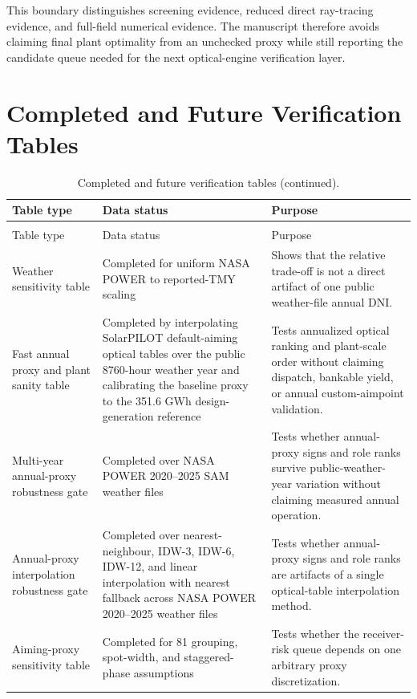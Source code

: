 \documentclass[final,3p,times]{elsarticle}
\begin{document}
This boundary distinguishes screening evidence, reduced direct ray-tracing evidence, and full-field numerical evidence. The manuscript therefore avoids claiming final plant optimality from an unchecked proxy while still reporting the candidate queue needed for the next optical-engine verification layer.

\section{Completed and Future Verification Tables}
\begin{longtable}{p{}p{}p{}}
\caption{Completed and future verification tables.} \label{tab:completed-future-verification}\\
\toprule
Table type & Data status & Purpose \\
\midrule
\endfirsthead
\caption[]{Completed and future verification tables (continued).}\\
\toprule
Table type & Data status & Purpose \\
\midrule
\endhead
Weather sensitivity table & Completed for uniform NASA POWER to reported-TMY scaling & Shows that the relative trade-off is not a direct artifact of one public weather-file annual DNI. \\
Fast annual proxy and plant sanity table & Completed by interpolating SolarPILOT default-aiming optical tables over the public 8760-hour weather year and calibrating the baseline proxy to the 351.6 GWh design-generation reference & Tests annualized optical ranking and plant-scale order without claiming dispatch, bankable yield, or annual custom-aimpoint validation. \\
Multi-year annual-proxy robustness gate & Completed over NASA POWER 2020--2025 SAM weather files & Tests whether annual-proxy signs and role ranks survive public-weather-year variation without claiming measured annual operation. \\
Annual-proxy interpolation robustness gate & Completed over nearest-neighbour, IDW-3, IDW-6, IDW-12, and linear interpolation with nearest fallback across NASA POWER 2020--2025 weather files & Tests whether annual-proxy signs and role ranks are artifacts of a single optical-table interpolation method. \\
Aiming-proxy sensitivity table & Completed for 81 grouping, spot-width, and staggered-phase assumptions & Tests whether the receiver-risk queue depends on one arbitrary proxy discretization. \\

\end{longtable}
\end{document}
